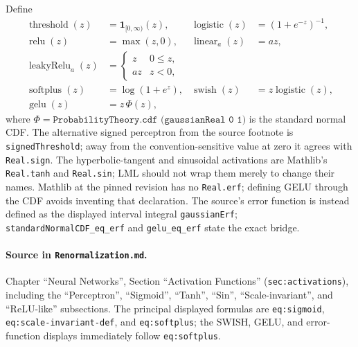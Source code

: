 \begin{definition}
\label{def:renorm:activations}
Define
\begin{align*}
 \operatorname{threshold}(z)&=\mathbf 1_{[0,\infty)}(z),&
 \operatorname{logistic}(z)&=(1+e^{-z})^{-1},\\
 \operatorname{relu}(z)&=\max(z,0),&
 \operatorname{linear}_a(z)&=az,\\
 \operatorname{leakyRelu}_a(z)&=\begin{cases}z&0\le z,\\az&z<0,\end{cases}\\
 \operatorname{softplus}(z)&=\log(1+e^z),&
 \operatorname{swish}(z)&=z\operatorname{logistic}(z),\\
 \operatorname{gelu}(z)&=z\,\Phi(z),
\end{align*}
where $\Phi=\texttt{ProbabilityTheory.cdf (gaussianReal 0 1)}$ is the standard normal CDF.
The alternative signed perceptron from the source footnote is \texttt{signedThreshold}; away from
the convention-sensitive value at zero it agrees with \texttt{Real.sign}.
The hyperbolic-tangent and sinusoidal activations are Mathlib's \texttt{Real.tanh} and
\texttt{Real.sin}; LML should not wrap them merely to change their names.
Mathlib at the pinned revision has no \texttt{Real.erf}; defining GELU through the CDF avoids
inventing that declaration.  The source's error function is instead defined as the displayed
interval integral \texttt{gaussianErf};
\texttt{standardNormalCDF\_eq\_erf} and \texttt{gelu\_eq\_erf} state the exact bridge.

\paragraph{Source in \texttt{Renormalization.md}.}
Chapter ``Neural Networks'', Section ``Activation Functions'' (\texttt{sec:activations}), including
the ``Perceptron'', ``Sigmoid'', ``Tanh'', ``Sin'', ``Scale-invariant'', and ``ReLU-like''
subsections.  The principal displayed formulas are \texttt{eq:sigmoid},
\texttt{eq:scale-invariant-def}, and \texttt{eq:softplus}; the SWISH, GELU, and error-function
displays immediately follow \texttt{eq:softplus}.
\end{definition}

